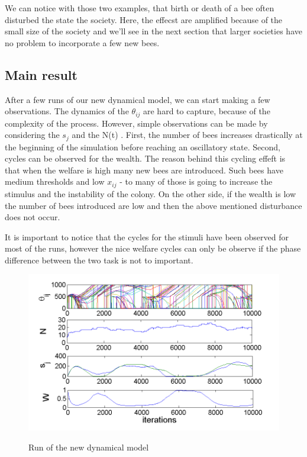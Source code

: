 We can notice with those two examples, that birth or death of a bee
often disturbed the state the society. Here, the effecst are amplified
because of the small size of the society and we'll see in the next
section that larger societies have no problem to incorporate a few
new bees.


\subsection{Main result}

After a few runs of our new dynamical model, we can start making a
few observations. The dynamics of the $\theta_{ij}$ are hard to capture,
because of the complexity of the process. However, simple observations
can be made by considering the $s_{j}$ and the N(t) . First, the
number of bees increases drastically at the beginning of the simulation
before reaching an oscillatory state. Second, cycles can be observed
for the wealth. The reason behind this cycling effeft is that when
the welfare is high many new bees are introduced. Such bees have medium
thresholds and low $x_{ij}$ - to many of those is going to increase
the stimulus and the instability of the colony. On the other side,
if the wealth is low the number of bees introduced are low and then
the above mentioned disturbance does not occur.

It is important to notice that the cycles for the stimuli have been
observed for most of the runs, however the nice welfare cycles can
only be observe if the phase difference between the two task is not
to important. 

\begin{figure}
\begin{centering}
\includegraphics[scale=0.8]{figures/Figure6}
\label{fig:figure8}
\par\end{centering}

\begin{centering}
\caption{Run of the new dynamical model}

\par\end{centering}

\end{figure}



